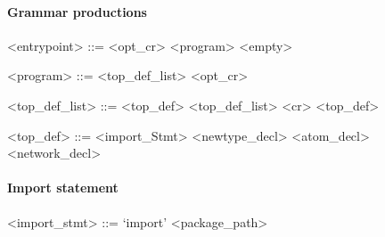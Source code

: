 \newcommand{\pn}[1]{\langle \textnormal{#1} \rangle}
\newcommand{\pp}{\models}
\newcommand{\oo}{\; \mid \;}
\newcommand{\sk}{\dots }
\newcommand{\ww}{\;}
\newcommand{\nn}{\perp}
\newcommand{\sm}[1]{\textnormal{#1}}
\newcommand{\sd}[1]{\textnormal{\it #1}}



\newcommand{\tn}[1]{`{#1}'}
\newcommand{\vs}[0]{\vspace{-12pt}}
\setlength{\grammarparsep}{20pt plus 1pt minus 1pt}
\setlength{\grammarindent}{10em}





\paragraph{Grammar productions}

\begin{grammar}
  <entrypoint> ::= <opt_cr> <program>
  \alt <empty>
\end{grammar}

\vs

\begin{grammar}
    <program> ::= <top_def_list> <opt_cr>
\end{grammar}

\vs

\begin{grammar}
  <top_def_list> ::= <top_def>
  \alt <top_def_list> <cr> <top_def>
\end{grammar}

\vs

\begin{grammar}
  <top_def> ::= <import_Stmt>
  \alt <newtype_decl>
  \alt <atom_decl>
  \alt <network_decl>
\end{grammar}


\paragraph{Import statement}

\begin{grammar}
  <import_stmt> ::= `import' <package_path>
\end{grammar}

